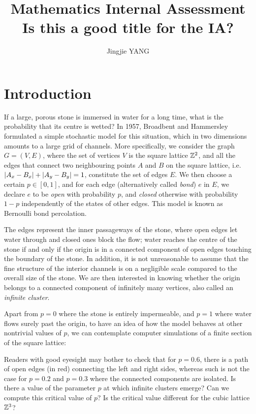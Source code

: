 \documentclass[a4paper, 12pt]{article}
\title{
\textbf{Mathematics Internal Assessment}\\
\bigskip
Is this a good title for the IA?
}
\author{Jingjie YANG}
\date{}
\begin{document}
\maketitle

\section{Introduction}
If a large, porous stone is immersed in water for a long time, what is the probability that its centre is wetted? In 1957, Broadbent and Hammersley \autocite*[693]{broadbent_hammersley_1957} formulated a simple stochastic model for this situation, which in two dimensions amounts to a large grid of channels. More specifically, we consider the graph $G = (V, E)$, where the set of vertices $V$ is the square lattice $\mathbb{Z}^2$, and all the edges that connect two neighbouring points $A$ and $B$ on the square lattice, i.e. $\lvert A_x - B_x \rvert + \lvert A_y - B_y \rvert = 1$, constitute the set of edges $E$. We then choose a certain $p \in [0, 1]$, and for each edge (alternatively called \textit{bond}) $e$ in $E$, we declare $e$ to be \textit{open} with probability $p$, and \textit{closed} otherwise with probability $1 - p$ independently of the states of other edges. This model is known as Bernoulli bond percolation.



The edges represent the inner passageways of the stone, where open edges let water through and closed ones block the flow; water reaches the centre of the stone if and only if the origin is in a connected component of open edges touching the boundary of the stone. In addition, it is not unreasonable to assume that the fine structure of the interior channels is on a negligible scale compared to the overall size of the stone. We are then interested in knowing whether the origin belongs to a connected component of infinitely many vertices, also called an \textit{infinite cluster}. 

Apart from $p = 0$ where the stone is entirely impermeable, and $p = 1$ where water flows surely past the origin, to have an idea of how the model behaves at other nontrivial values of $p$, we can contemplate computer simulations of a finite section of the square lattice:


\break 

Readers with good eyesight may bother to check that for $p = 0.6$, there is a path of open edges (in red) connecting the left and right sides, whereas such is not the case for $p = 0.2$ and $p = 0.3$ where the connected components are isolated. Is there a value of the parameter $p$ at which infinite clusters emerge? Can we compute this critical value of $p$? Is the critical value different for the cubic lattice $\mathbb{Z}^3$?
\end{document}
